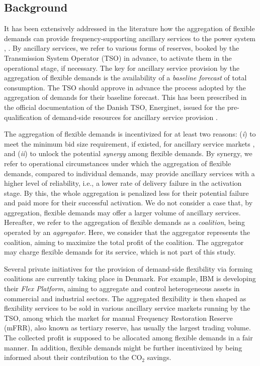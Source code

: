\documentclass[conference]{IEEEtran}
\begin{document}
\subsection{Background}
It has been extensively addressed in the literature how the aggregation of flexible demands can provide frequency-supporting ancillary services to the power system \cite{biegel2014value}, \cite{macdonald2020demand}. By ancillary services, we refer to various forms of reserves, booked by the Transmission System Operator (TSO) in advance, to activate them in the operational stage, if necessary. The key for ancillary service provision by the aggregation of flexible demands is the availability of a \textit{baseline forecast} of total consumption. The TSO should approve in advance the process adopted by the aggregation of demands for their baseline forecast. This has been prescribed in the official documentation of the Danish TSO, Energinet, issued for the pre-qualification of demand-side resources for ancillary service provision \cite{energinet:prequalification}.

The aggregation of flexible demands is incentivized for at least two reasons: (\textit{i}) to meet the minimum bid size requirement, if existed, for ancillary service markets \cite{energinet:Systemydelser}, and (\textit{ii}) to unlock the potential \textit{synergy} among flexible demands. By synergy, we refer to operational circumstances under which the aggregation of flexible demands, compared to individual demands, may provide ancillary services with a higher level of reliability, i.e., a lower rate of delivery failure in the activation stage. By this, the whole aggregation is penalized less for their potential failure and paid more for their successful activation. We do not consider a case that, by aggregation, flexible demands may offer a larger volume of ancillary services. Hereafter, we refer to the aggregation of flexible demands as a \textit{coalition}, being operated by an \textit{aggregator}. Here, we consider that the aggregator represents the coalition, aiming to maximize the total profit of the coalition. The aggregator may charge flexible demands for its service, which is not part of this study.

Several private initiatives for the provision of demand-side flexibility via forming coalitions  are currently taking place in Denmark. For example, IBM is developing their \textit{Flex Platform}, aiming to aggregate and control heterogeneous assets in  commercial and industrial sectors. The aggregated flexibility is then shaped as flexibility services to be sold in various ancillary service markets running by the TSO, among which the market for manual Frequency Restoration Reserve (mFRR), also known as tertiary reserve, has usually the largest trading volume. The collected profit is supposed to be allocated among flexible demands in a fair manner. In addition, flexible demands might be further incentivized by being informed about their contribution to the CO$_{2}$ savings.
\end{document}
